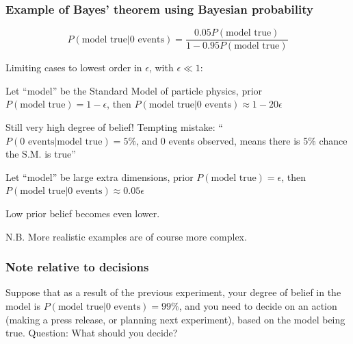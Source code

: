 \documentclass[9pt]{beamer}
\newif\ifmynote
\newcommand\mynote[1]{%
\ifmynote \textbf{#1} \else \fi
}
\begin{document}
\begin{frame}
 \frametitle{Example  of Bayes' theorem using Bayesian probability}
 
 \mynote{Écrire au tableau}
 
 $$P(\text{model true} | \text{0 events}) = \frac{0.05  P(\text{model true})}{1 - 0.95 P(\text{model true})}$$
 
Limiting cases to lowest order in $\epsilon$, with $\epsilon \ll 1$:

\vspace{10pt}

Let ``model'' be the Standard Model of particle physics, prior $P(\text{model true}) = 1 - \epsilon$, then $P(\text{model true} | \text{0 events}) \approx 1 - 20\epsilon$

Still very high degree of belief! Tempting mistake: ``$P(\text{0 events} | \text{model true}) = 5\%$, and 0 events observed, means there is 5\% chance the S.M. is true'' 

\vspace{10pt}

Let ``model'' be large extra dimensions, prior $P(\text{model true}) = \epsilon$, then $P(\text{model true} | \text{0 events}) \approx 0.05 \epsilon$

Low prior belief becomes even lower.

\vspace{10pt}

N.B. More realistic examples are of course more complex.

\end{frame}

\begin{frame}
 \frametitle{Note relative to decisions}
 
 Suppose that as a result of the previous experiment, your degree
of belief in the model is $P(\text{model true} | \text{0 events}) = 99\%$, and you
need to decide on an action (making a press release, or planning
next experiment), based on the model being true.
Question: What should you decide?

\vspace{10pt}


\end{frame}
\end{document}
